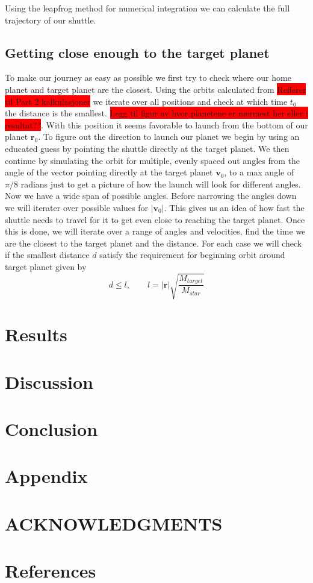 \documentclass[reprint,english,notitlepage]{revtex4-2}
\begin{document}
Using the leapfrog method for numerical integration we can calculate the full trajectory of our shuttle.
\newline

\subsection{Getting close enough to the target planet}
To make our journey as easy as possible we first try to check where our home planet and target planet are the closest. Using the orbits calculated from \colorbox{red}{Refferer til Part 2 kalkulasjoner} we iterate over all positions and check at which time $ t_{0} $ the distance is the smallest. \colorbox{red}{Legg til figur av hvor planetene er nærmest her eller i resultat??}. With this position it seems favorable to launch from the bottom of our planet $ \mathbf{r}_0 $. To figure out the direction to launch our planet we begin by using an educated guess by pointing the shuttle directly at the target planet. We then continue by simulating the orbit for multiple, evenly spaced out angles from the angle of the vector pointing directly at the target planet $ \mathbf{v}_0 $, to a max angle of $ π/8 $ radians just to get a picture of how the launch will look for different angles.  Now we have a wide span of possible angles. Before narrowing the angles down we will iterater over possible values for $ \left\vert \mathbf{v}_0 \right\vert  $. This gives us an idea of how fast the shuttle needs to travel for it to get even close to reaching the target planet. Once this is done, we will iterate over a range of angles and velocities, find the time we are the closest to the target planet and the distance. For each case we will check if the smallest distance $ d $ satisfy the requirement for beginning orbit around target planet given by 
\[
d \le l, \qquad l = \left\vert \mathbf{r} \right\vert \sqrt{\frac{M_{target}}{M_{star}}}  
\]


\section{Results} \label{sec: results}

\section{Discussion} \label{sec: discussion}

\section{Conclusion} \label{sec: conclusion}

\section{Appendix} \label{sec: appendix}

\section*{ACKNOWLEDGMENTS}

\section*{References} \label{sec: references}
\end{document}
